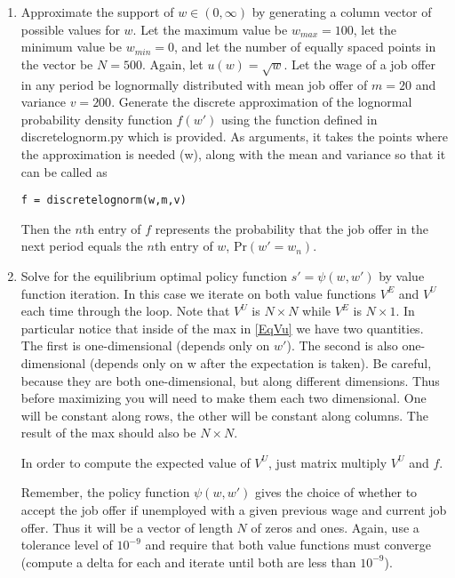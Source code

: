 \begin{problem}
\begin{enumerate}

   \item Approximate the support of $w\in(0,\infty)$ by generating a column vector of possible values for $w$. Let the maximum value be $w_{max} = 100$, let the minimum value be $w_{min} = 0$, and let the number of equally spaced points in the vector be $N = 500$. Again, let $u(w) = \sqrt{w}$.  Let the wage of a job offer in any period be lognormally distributed with mean job offer of $m=20$ and variance $v =200$.  Generate the discrete approximation of the lognormal probability density function $f(w')$ using the function defined in discretelognorm.py which is provided.  As arguments, it takes the points where the approximation is needed (w), along with the mean and variance so that it can be called as

\begin{lstlisting}[style=python]
f = discretelognorm(w,m,v)
\end{lstlisting}

    Then the $n$th entry of $f$ represents the probability that the job offer in the next period equals the $n$th entry of $w$, $\text{Pr}(w' = w_n)$.

   \item Solve for the equilibrium optimal policy function $s' = \psi(w,w')$ by value function iteration.  In this case we iterate on both value functions $V^E$ and $V^U$ each time through the loop.  Note that $V^U$ is $N\times N$ while $V^E$ is $N\times 1$.  In particular notice that inside of the max in \eqref{EqVu} we have two quantities.  The first is one-dimensional (depends only on $w'$).  The second is also one-dimensional (depends only on w after the expectation is taken).  Be careful, because they are both one-dimensional, but along different dimensions.  Thus before maximizing you will need to make them each two dimensional.  One will be constant along rows, the other will be constant along columns.  The result of the max should also be $N\times N$.
        
       In order to compute the expected value of $V^U$, just matrix multiply $V^U$ and $f$.
       
       Remember, the policy function $\psi(w,w')$ gives the choice of whether to accept the job offer if unemployed with a given previous wage and current job offer.  Thus it will be a vector of length $N$ of zeros and ones.  Again, use a tolerance level of $10^{-9}$ and require that both value functions must converge (compute a delta for each and iterate until both are less than $10^{-9}$).


\end{enumerate}
\end{problem}
